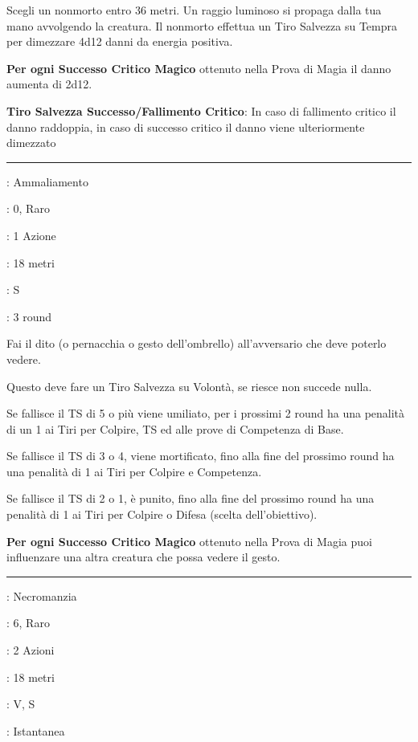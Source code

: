 \begin{multicols}{2}
Scegli un nonmorto entro 36 metri. Un raggio luminoso si propaga dalla tua mano avvolgendo la creatura. Il nonmorto effettua un Tiro Salvezza su Tempra per dimezzare 4d12 danni da energia positiva.

\textbf{Per ogni Successo Critico Magico} ottenuto nella Prova di Magia il danno aumenta di 2d12.

\textbf{Tiro Salvezza Successo/Fallimento Critico}: In caso di fallimento critico il danno raddoppia, in caso di successo critico il danno viene ulteriormente dimezzato

\smallskip\noindent\rule{\linewidth}{2pt} \hypertarget{Dito}{}\medskip{}
\noindent
\begin{description}[noitemsep, topsep=0pt, parsep=0pt, partopsep=0pt, leftmargin=0cm, labelwidth=2.8cm]
	\item[\textbf{Lista di Magia}]: Ammaliamento
	\item[\textbf{Livello}]: 0, Raro
	\item[\textbf{T. di Lancio}]: 1 Azione
	\item[\textbf{Gittata}]: 18 metri
	\item[\textbf{Componenti}]: S
	\item[\textbf{Durata}]: 3 round
\end{description}

Fai il dito (o pernacchia o gesto dell'ombrello) all'avversario che deve poterlo vedere.

Questo deve fare un Tiro Salvezza su Volontà, se riesce non succede nulla.

Se fallisce il TS di 5 o più viene umiliato, per i prossimi 2 round ha una penalità di un 1 ai Tiri per Colpire, TS ed alle prove di Competenza di Base.

Se fallisce il TS di 3 o 4, viene mortificato, fino alla fine del prossimo round ha una penalità di 1 ai Tiri per Colpire e Competenza.

Se fallisce il TS di 2 o 1, è punito, fino alla fine del prossimo round ha una penalità di 1 ai Tiri per Colpire o Difesa (scelta dell'obiettivo).

\textbf{Per ogni Successo Critico Magico} ottenuto nella Prova di Magia puoi influenzare una altra creatura che possa vedere il gesto.

\smallskip\noindent\rule{\linewidth}{2pt} \hypertarget{Dito della Morte}{}\medskip{}
\noindent
\begin{description}[noitemsep, topsep=0pt, parsep=0pt, partopsep=0pt, leftmargin=0cm, labelwidth=2.8cm]
	\item[\textbf{Lista di Magia}]: Necromanzia
	\item[\textbf{Livello}]: 6, Raro
	\item[\textbf{T. di Lancio}]: 2 Azioni
	\item[\textbf{Gittata}]: 18 metri
	\item[\textbf{Componenti}]: V, S
	\item[\textbf{Durata}]: Istantanea
\end{description}


\end{multicols}
